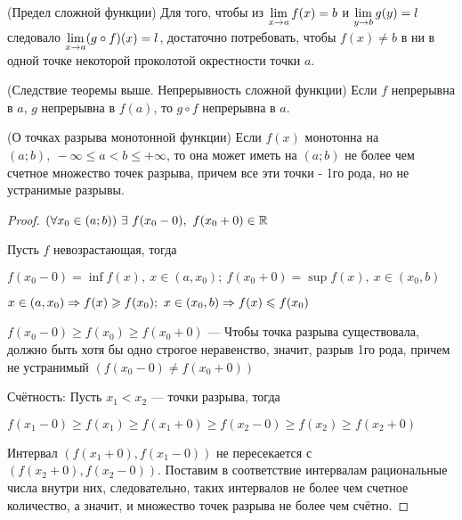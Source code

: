 \begin{note} (Предел сложной функции)
	Для того, чтобы из $\lim\limits_{x \to a} f(x) = b$ и
	$\lim\limits_{y \to b} g(y) = l$ следовало $\lim\limits_{x \to a}
	(g \circ f)(x) = l$, достаточно потребовать, чтобы
	$f(x) \neq b$ в ни в одной точке некоторой проколотой
	окрестности точки $a$.
\end{note}

\begin{addition} (Следствие теоремы выше. Непрерывность сложной функции)
	Если $f$ непрерывна в $a$, $g$ непрерывна в $f(a)$, то $g \circ f$ непрерывна в $a$.
\end{addition}

\begin{theorem} (О точках разрыва монотонной функции)
	Если $f(x)$ монотонна на $(a; b),\ -\infty 
	\le a < b \le +\infty$, то она может иметь на $(a; b)$ не более
	чем счетное множество точек разрыва, причем все эти точки - 1го
	рода, но не устранимые разрывы.
\end{theorem}

\begin{proof}
	$(\forall x_0 \in (a; b))\ \exists \ f(x_0 - 0),\ f(x_0 + 0) \in \R$
	
	Пусть $f$ невозрастающая, тогда

	$f(x_0 - 0) = \inf f(x),\ x \in (a, x_0);\ f(x_0 + 0) = \sup f(x),\ x\in (x_0, b)$

	$x \in (a, x_0) \Rightarrow f(x) \geqslant f(x_0);\ x \in (x_0, b) \Rightarrow f(x) \leqslant f(x_0)$

	$f(x_0 - 0) \ge f(x_0) \ge f(x_0 + 0)$ --- Чтобы точка разрыва существовала,
	должно быть хотя бы одно строгое неравенство, значит, разрыв 1го рода,
	причем не устранимый $(f(x_0 - 0) \neq f(x_0 + 0))$

	Счётность: Пусть $x_1 < x_2$ --- точки разрыва, тогда
	
	$f(x_1 - 0)
	\ge f(x_1) \ge f(x_1 + 0) \ge f(x_2 - 0) \ge f(x_2) \ge
	f(x_2 + 0)$

	Интервал $(f(x_1 + 0), f(x_1 - 0))$ не пересекается с
	$(f(x_2 + 0), f(x_2 - 0))$. Поставим в соответствие интервалам
	рациональные числа внутри них, следовательно, таких интервалов
	не более чем счетное количество, а значит, и множество точек разрыва
	не более чем счётно.

\end{proof}

